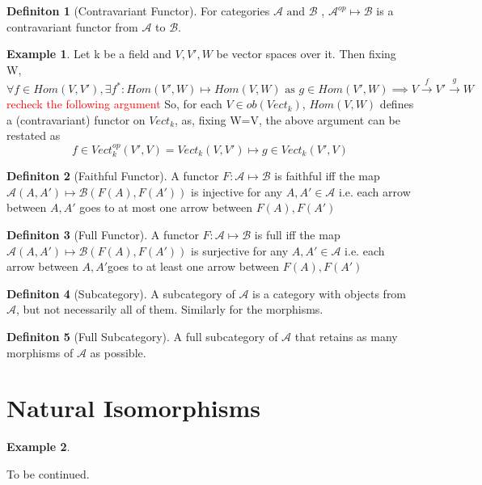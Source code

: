 \documentclass{article}
\theoremstyle{definition}
\newtheorem{example}{Example}[section]
\theoremstyle{definition}
\newtheorem{definition}{Definiton}[section]
\begin{document}
\begin{definition}[Contravariant Functor] %
	For categories $ \mathcal{A} \text{ and }\mathcal{B}  $ , $ \mathcal{A} ^{op} \mapsto \mathcal{B} $ is a contravariant functor from $ \mathcal{A}  $ to $ \mathcal{B}  $.
\end{definition}
\begin{example}
	Let k be a field and $ V,V',W $ be vector spaces over it. Then fixing W,
	\[ \forall f \in Hom(V,V'), \exists f^*:Hom(V',W) \mapsto Hom(V,W) \text{ as } g \in Hom(V',W) \implies V \xrightarrow{f}V'\xrightarrow{g}W  \]
	\textcolor{red}{recheck the following argument}
	So, for each $ V \in ob(Vect_k)$, $ Hom(V,W) $ defines a (contravariant) functor on $ Vect_k $, as, fixing W=V, the above argument can be restated as
	\[ f \in Vect_k^{op}(V',V)=Vect_k(V,V') \mapsto g \in Vect_k(V',V)   \]
\end{example}

\begin{definition}[Faithful Functor] %
	A functor $ F:\mathcal{A}  \mapsto \mathcal{B} $ is faithful iff the map$ \mathcal{A} (A,A') \mapsto \mathcal{B}(F(A),F(A'))$ is injective for any $ A,A' \in \mathcal{A} $ i.e. each arrow between $ A,A' $ goes to at most one arrow between $ F(A),F(A') $
\end{definition}
\begin{definition}[Full Functor] %
	A functor $ F:\mathcal{A}  \mapsto \mathcal{B} $ is full iff the map$ \mathcal{A} (A,A') \mapsto \mathcal{B}(F(A),F(A'))$ is surjective for any $ A,A' \in \mathcal{A} $ i.e. each arrow between $  A,A' $goes to at least one arrow between $ F(A),F(A') $
\end{definition}

\begin{definition}[Subcategory] %
A subcategory of $ \mathcal{A}  $ is a category with objects from $ \mathcal{A} $, but not necessarily all of them. Similarly for the morphisms.
\end{definition}

\begin{definition}[Full Subcategory] %
A full subcategory of $ \mathcal{A} $ that retains as many morphisms of $ \mathcal{A} $ as possible.
\end{definition}



\section{Natural Isomorphisms}
\label{sec:Natural Isomorphisms}
\begin{example}
\end{example}


\pagebreak
To be continued.
\end{document}
